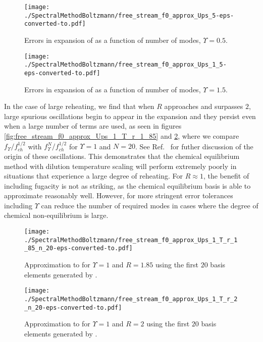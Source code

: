 \begin{figure}[H]
 \begin{minipage}[b]{0.5\linewidth}
\centerline{\texttt{[image: ./SpectralMethodBoltzmann/free\_stream\_f0\_approx\_Ups\_5-eps-converted-to.pdf]}}
\caption{Errors in expansion of  as a function of number of modes, $\Upsilon=0.5$.}\label{fig:free_stream_f0_approx_Ups_5}
 \end{minipage}
 \hspace{0.5cm}
 \begin{minipage}[b]{0.5\linewidth}
\centerline{\texttt{[image: ./SpectralMethodBoltzmann/free\_stream\_f0\_approx\_Ups\_1\_5-eps-converted-to.pdf]}}
\caption{Errors in  expansion of  as a function of number of modes, $\Upsilon=1.5$.}\label{fig:free_stream_f0_approx_Ups_1_5}
 \end{minipage}
 \end{figure}



 In the case of large reheating, we find that when $R$ approaches and surpasses $2$, large spurious oscillations begin to appear in the expansion and they persist even when a large number of terms are used, as seen in figures  \ref{fig:free_stream_f0_approx_Ups_1_T_r_1_85} and \ref{fig:free_stream_f0_approx_Ups_1_T_r_2}, where we compare $f_\Upsilon/f_{ch}^{1/2}$ with $f_{\Upsilon}^N/f_{ch}^{1/2}$ for $\Upsilon=1$ and $N=20$.    See Ref.~\cite{Birrell_orthopoly} for futher discussion of the origin of these oscillations. This demonstrates that the chemical equilibrium method with dilution temperature scaling will  perform extremely poorly in situations that experience a large degree of reheating. For $R\approx 1$, the benefit of including fugacity is not as striking, as the chemical equilibrium basis is able to approximate  reasonably well.  However, for more stringent error tolerances including $\Upsilon$ can reduce the number of required modes in cases where the degree of chemical non-equilibrium is large.
\begin{figure}[H]
 \begin{minipage}[b]{0.5\linewidth}
\centerline{\texttt{[image: ./SpectralMethodBoltzmann/free\_stream\_f0\_approx\_Ups\_1\_T\_r\_1\_85\_n\_20-eps-converted-to.pdf]}}
\caption{Approximation to  for $\Upsilon=1$ and $R=1.85$ using the first $20$ basis elements generated by .}\label{fig:free_stream_f0_approx_Ups_1_T_r_1_85}
 \end{minipage}
 \hspace{0.5cm}
 \begin{minipage}[b]{0.5\linewidth}
\centerline{\texttt{[image: ./SpectralMethodBoltzmann/free\_stream\_f0\_approx\_Ups\_1\_T\_r\_2\_n\_20-eps-converted-to.pdf]}}
\caption{Approximation to  for $\Upsilon=1$ and $R=2$ using the first $20$ basis elements generated by .}\label{fig:free_stream_f0_approx_Ups_1_T_r_2}
 \end{minipage}
 \end{figure}

